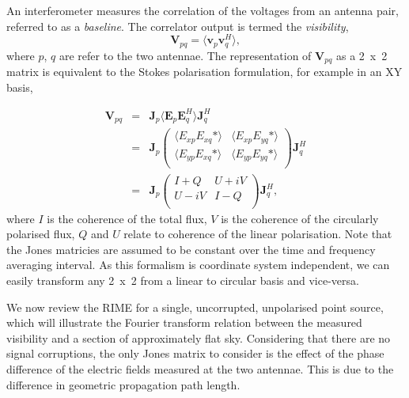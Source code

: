 An interferometer measures the correlation of the voltages from an antenna pair, referred to as a  \emph{baseline}. The correlator output is termed the \emph{visibility}, 
\begin{equation}
\bm{V}_{pq} = \langle {\bm v}_p  {\bm v}_q^H \rangle,
\end{equation}
where $p$, $q$ are refer to the two antennae. The representation of  $\bm{V}_{pq}$ as a 2~x~2 matrix is equivalent to the Stokes polarisation formulation, for example in an XY basis,


\begin{eqnarray}
\bm{V}_{pq} &= & \bm{J}_p \langle {\bm E}_p  {\bm E}_q^H \rangle \bm{J}_q^H \\
&=&  \bm{J}_p\left(
\begin{array}{cc}
\langle E_{xp} E_{xq}* \rangle & \langle E_{xp} E_{yq}* \rangle \\
\langle E_{yp} E_{xq}* \rangle & \langle E_{yp} E_{yq}* \rangle \\
\end{array} 
\right) \bm{J}_q^H \\ 
&=&
 \bm{J}_p \left(
\begin{array}{cc}
I+Q & U +iV\\
U-iV & I-Q \\
\end{array}
\right)\bm{J}_q^H,
\end{eqnarray}
where $I$ is the coherence of the total flux, $V$ is the coherence of the circularly polarised flux, $Q$ and $U$ relate to coherence of the linear polarisation. Note that the Jones matricies are assumed to be constant over the time and frequency averaging interval. As this formalism is coordinate system independent, we can easily transform any 2~x~2 from a linear to circular basis and vice-versa. 

We now review the RIME for a single, uncorrupted, unpolarised point source, which will illustrate the Fourier transform relation between the measured visibility and a section of approximately flat sky.
Considering that there are no signal corruptions, the only Jones matrix to consider is the effect of the phase difference of the electric fields measured at the two antennae. This is due to the difference in geometric propagation path length.


